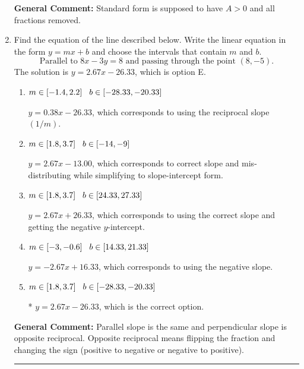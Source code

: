 \documentclass{extbook}[14pt]
\newcommand{\litem}[1]{\item #1

\rule{\textwidth}{0.4pt}}
\begin{document}
\begin{enumerate}
{\textbf{General Comment:} Standard form is supposed to have $A > 0$ and all fractions removed.
}
\litem{
Find the equation of the line described below. Write the linear equation in the form $ y=mx+b $ and choose the intervals that contain $m$ and $b$.
\[ \text{Parallel to } 8 x - 3 y = 8 \text{ and passing through the point } (8, -5). \]The solution is \( y = 2.67x - 26.33 \), which is option E.\begin{enumerate}[label=\Alph*.]
\item \( m \in [-1.4, 2.2] \hspace*{3mm} b \in [-28.33, -20.33] \)

 $y = 0.38x - 26.33$, which corresponds to using the reciprocal slope $(1/m)$.
\item \( m \in [1.8, 3.7] \hspace*{3mm} b \in [-14, -9] \)

 $y = 2.67x - 13.00$, which corresponds to correct slope and mis-distributing while simplifying to slope-intercept form.
\item \( m \in [1.8, 3.7] \hspace*{3mm} b \in [24.33, 27.33] \)

 $y = 2.67x + 26.33$, which corresponds to using the correct slope and getting the negative $y$-intercept.
\item \( m \in [-3, -0.6] \hspace*{3mm} b \in [14.33, 21.33] \)

 $y = -2.67x + 16.33$, which corresponds to using the negative slope.
\item \( m \in [1.8, 3.7] \hspace*{3mm} b \in [-28.33, -20.33] \)

* $y = 2.67x - 26.33$, which is the correct option.
\end{enumerate}

\textbf{General Comment:} Parallel slope is the same and perpendicular slope is opposite reciprocal. Opposite reciprocal means flipping the fraction and changing the sign (positive to negative or negative to positive).
}
\end{enumerate}
\end{document}
